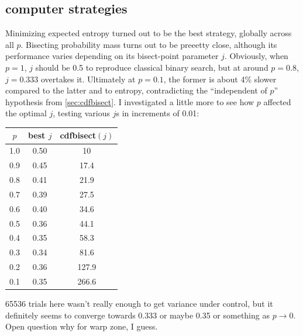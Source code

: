 \documentclass[11pt]{sigplanconf}
\begin{document}
\subsection{computer strategies}

Minimizing expected entropy
turned out to be the best strategy, globally across all $p$.
Bisecting probability mass
turns out to be preeetty close,
although its performance varies depending on its bisect-point parameter $j$.
Obviously, when $p=1$, $j$ should be 0.5 to reproduce classical binary search,
but at around $p=0.8$, $j=0.333$ overtakes it.
Ultimately at $p=0.1$, the former is about 4\% slower compared to the latter and to entropy,
contradicting the ``independent of $p$'' hypothesis from \cref{sec:cdfbisect}.
I investigated a little more to see how $p$ affected the optimal $j$, testing various $j$s in increments of 0.01:
\begin{center}
	\begin{tabular}{c|cc}
		$p$ & best $j$ & {\sf cdfbisect}$(j)$ \\
		\hline
		1.0 & 0.50 & 10     \\
		0.9 & 0.45 & 17.4   \\
		0.8 & 0.41 & 21.9   \\
		0.7 & 0.39 & 27.5   \\
		0.6 & 0.40 & 34.6   \\
		0.5 & 0.36 & 44.1   \\
		0.4 & 0.35 & 58.3   \\
		0.3 & 0.34 & 81.6   \\
		0.2 & 0.36 & 127.9  \\
		0.1 & 0.35 & 266.6  \\
	\end{tabular}
\end{center}
65536 trials here wasn't really enough to get variance under control,
but it definitely seems to converge towards 0.333 or maybe 0.35 or something as $p \rightarrow 0$.
Open question why for warp zone, I guess.
\end{document}
